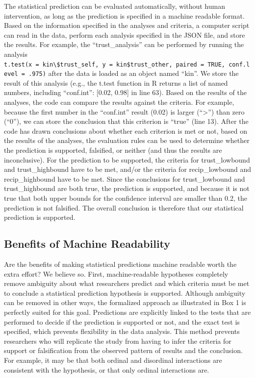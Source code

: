 \documentclass[doc,floatsintext]{apa6}
\begin{document}
The statistical prediction can be evaluated automatically, without human intervention, as long as the prediction is specified in a machine readable format. Based on the information specified in the analyses and criteria, a computer script can read in the data, perform each analysis specified in the JSON file, and store the results. For example, the \enquote{trust\_analysis} can be performed by running the analysis \texttt{t.test(x\ =\ kin\textbackslash{}\$trust\_self,\ y\ =\ kin\$trust\_other,\ paired\ =\ TRUE,\ conf.level\ =\ .975)} after the data is loaded as an object named \enquote{kin}. We store the result of this analysis (e.g., the t.test function in R returns a list of named numbers, including \enquote{conf.int}: {[}0.02, 0.98{]} in line 63). Based on the results of the analyses, the code can compare the results against the criteria. For example, because the first number in the \enquote{conf.int} result (0.02) is larger (\enquote{\textgreater{}}) than zero (\enquote{0}), we can store the conclusion that this criterion is \enquote{true} (line 13). After the code has drawn conclusions about whether each criterion is met or not, based on the results of the analyses, the evaluation rules can be used to determine whether the prediction is supported, falsified, or neither (and thus the results are inconclusive). For the prediction to be supported, the criteria for trust\_lowbound and trust\_highbound have to be met, and/or the criteria for recip\_lowbound and recip\_highbound have to be met. Since the conclusions for trust\_lowbound and trust\_highbound are both true, the prediction is supported, and because it is not true that both upper bounds for the confidence interval are smaller than 0.2, the prediction is not falsified. The overall conclusion is therefore that our statistical prediction is supported.

\hypertarget{benefits-of-machine-readability}{%
\subsection{Benefits of Machine Readability}\label{benefits-of-machine-readability}}

Are the benefits of making statistical predictions machine readable worth the extra effort? We believe so. First, machine-readable hypotheses completely remove ambiguity about what researchers predict and which criteria must be met to conclude a statistical prediction hypothesis is supported. Although ambiguity can be removed in other ways, the formalized approach as illustrated in Box 1 is perfectly suited for this goal. Predictions are explicitly linked to the tests that are performed to decide if the prediction is supported or not, and the exact test is specified, which prevents flexibility in the data analysis. This method prevents researchers who will replicate the study from having to infer the criteria for support or falsification from the observed pattern of results and the conclusion. For example, it may be that both ordinal and disordinal interactions are consistent with the hypothesis, or that only ordinal interactions are.
\end{document}
